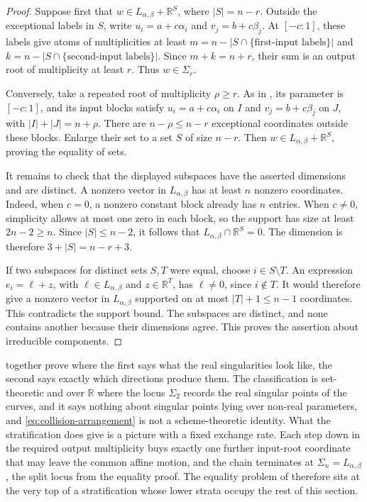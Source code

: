 \documentclass[12pt,reqno]{amsart}
\theoremstyle{definition}
\theoremstyle{remark}
\newcommand{\R}{\mathbb R}
\begin{document}
\begin{proof}
Suppose first that \(w\in L_{\alpha,\beta}+\R^S\), where
\(|S|=n-r\).  Outside the exceptional labels in \(S\), write
\(u_i=a+c\alpha_i\) and \(v_j=b+c\beta_j\).  At
\([-c:1]\), these labels give atoms of multiplicities at least
\(m=n-|S\cap\{\text{first-input labels}\}|\) and
\(k=n-|S\cap\{\text{second-input labels}\}|\).  Since
\(m+k=n+r\), their sum is an output root of multiplicity at least
\(r\).  Thus \(w\in\Sigma_r\).

Conversely, take a repeated root of multiplicity \(\rho\geq r\).
As in , its parameter is
\([-c:1]\), and its input blocks satisfy
\(u_i=a+c\alpha_i\) on \(I\) and
\(v_j=b+c\beta_j\) on \(J\), with
\(|I|+|J|=n+\rho\).  There are \(n-\rho\leq n-r\)
exceptional coordinates outside these blocks.  Enlarge their set to a
set \(S\) of size \(n-r\).  Then
\(w\in L_{\alpha,\beta}+\R^S\), proving the equality of sets.

It remains to check that the displayed subspaces have the asserted
dimensions and are distinct.  A nonzero vector in \(L_{\alpha,\beta}\)
has at least \(n\) nonzero coordinates.  Indeed, when \(c=0\), a
nonzero constant block already has \(n\) entries.  When \(c\ne0\),
simplicity allows at most one zero in each block, so the support has size
at least \(2n-2\geq n\).  Since \(|S|\leq n-2\), it follows that
\(L_{\alpha,\beta}\cap\R^S=0\).  The dimension is therefore
\(3+|S|=n-r+3\).

If two subspaces for distinct sets \(S,T\) were equal, choose
\(i\in S\setminus T\).  An expression
\(e_i=\ell+z\), with \(\ell\in L_{\alpha,\beta}\) and
\(z\in\R^T\), has \(\ell\ne0\), since \(i\notin T\).
It would therefore give a nonzero vector in \(L_{\alpha,\beta}\)
supported on at most \(|T|+1\leq n-1\) coordinates.  This contradicts the support bound.
The subspaces are distinct, and none contains another because their
dimensions agree.  This proves the assertion about irreducible
components.
\end{proof}

 together
prove  where the first says what the real
singularities look like, the second says exactly which directions produce
them. The classification is set-theoretic and over \(\R\) where the locus \(\Sigma_2\) records the real singular points of the curves, and it says nothing about singular points lying over non-real parameters, and \eqref{eq:collision-arrangement} is not a scheme-theoretic identity.  What the stratification does give is a picture with a fixed exchange rate. Each step down in the required output multiplicity buys exactly one further input-root coordinate that may leave the common affine motion, and the chain terminates at \(\Sigma_n=L_{\alpha,\beta}\), the split locus from the equality proof. The equality problem of  therefore sits at the very top of a stratification whose lower strata occupy the rest of this section.
\end{document}
